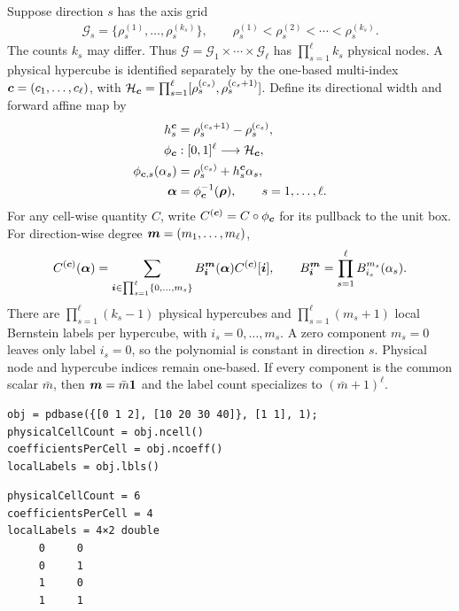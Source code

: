 Suppose direction $s$ has the axis grid
\begin{gather*}
  \mathcal G_s=\{\rho_s^{(1)},\ldots,\rho_s^{(k_s)}\},
  \qquad
  \rho_s^{(1)}<\rho_s^{(2)}<\cdots<\rho_s^{(k_s)}.
\end{gather*}
The counts $k_s$ may differ. Thus $\mathcal G=\mathcal G_1\times\cdots\times\mathcal G_\ell$ has $\prod_{s=1}^{\ell} k_s$ physical nodes. A physical hypercube is identified separately by the one-based multi-index $\boldsymbol{c}=(c_1,\ldots,c_\ell)$, with $\mathcal H_{\boldsymbol{c}}=\prod_{s=1}^{\ell}[\rho_s^{(c_s)},\rho_s^{(c_s+1)}]$. Define its directional width and forward affine map by
\begin{gather*}
\begin{aligned}
  h_s^{\boldsymbol{c}}
    &=\rho_s^{(c_s+1)}-\rho_s^{(c_s)},\\
  \phi_{\boldsymbol{c}}&:[0,1]^\ell\longrightarrow\mathcal H_{\boldsymbol{c}},\\
  \phi_{\boldsymbol{c},s}(\alpha_s)
    &=\rho_s^{(c_s)}+h_s^{\boldsymbol{c}}\alpha_s,\\
  \boldsymbol{\alpha}
    &=\phi_{\boldsymbol{c}}^{-1}(\boldsymbol{\rho}),
    \qquad s=1,\ldots,\ell.
\end{aligned}
\end{gather*}
For any cell-wise quantity $C$, write $C^{(\boldsymbol{c})}=C\circ\phi_{\boldsymbol{c}}$ for its pullback to the unit box. For direction-wise degree $\boldsymbol{m}=(m_1,\ldots,m_\ell)$,
\begin{gather*}
C^{(\boldsymbol{c})}(\boldsymbol{\alpha})=
  \sum_{\boldsymbol{i}\in\prod_{s=1}^{\ell}\{0,\ldots,m_s\}}
B_{\boldsymbol{i}}^{\boldsymbol{m}}(\boldsymbol{\alpha})
  C^{(\boldsymbol{c})}[\boldsymbol{i}],
  \qquad
B_{\boldsymbol{i}}^{\boldsymbol{m}}=
  \prod_{s=1}^{\ell}B_{i_s}^{m_s}(\alpha_s).
\end{gather*}
There are $\prod_{s=1}^{\ell}(k_s-1)$ physical hypercubes and $\prod_{s=1}^{\ell}(m_s+1)$ local Bernstein labels per hypercube, with $i_s=0,\ldots,m_s$. A zero component $m_s=0$ leaves only label $i_s=0$, so the polynomial is constant in direction $s$. Physical node and hypercube indices remain one-based. If every component is the common scalar $\bar m$, then $\boldsymbol{m}=\bar m\boldsymbol{1}$ and the label count specializes to $(\bar m+1)^\ell$.

\begin{lstlisting}[style=dpmatlab]
obj = pdbase({[0 1 2], [10 20 30 40]}, [1 1], 1);
physicalCellCount = obj.ncell()
coefficientsPerCell = obj.ncoeff()
localLabels = obj.lbls()
\end{lstlisting}

\begin{lstlisting}[style=dpoutput]
physicalCellCount = 6
coefficientsPerCell = 4
localLabels = 4×2 double
     0     0
     0     1
     1     0
     1     1
\end{lstlisting}

